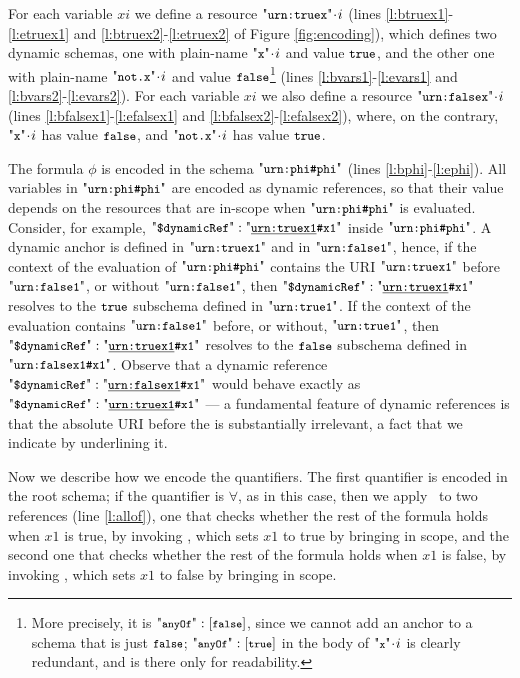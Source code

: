 For each variable $xi$ we define a resource $\qkw{urn:truex}\cat i$ (lines \ref{l:btruex1}-\ref{l:etruex1} 
and \ref{l:btruex2}-\ref{l:etruex2}  of Figure \ref{fig:encoding}), 
which defines two dynamic schemas,
one with plain-name $\qkw{x}\cat i$ and value $\mbox{\tt{\small true}}$, and the other one with plain-name $\qkw{not.x}\cat i$ and value 
$\mbox{\tt{\small false}}$\footnote{More precisely, it is $\qkw{\footnotesize anyOf}: [\akw{\footnotesize false}]$,
since we cannot add an anchor to a schema that is just $\mbox{\tt{\small \footnotesize false}}$; 
$\qkw{\footnotesize anyOf}: [\akw{\footnotesize true}]$ in the body of  $\qkw{\footnotesize x}\cat i$ is clearly redundant, and is there only for readability.}
(lines \ref{l:bvars1}-\ref{l:evars1}  and \ref{l:bvars2}-\ref{l:evars2}).
For each variable $xi$ we also define a resource $\qkw{urn:falsex}\cat i$ 
(lines \ref{l:bfalsex1}-\ref{l:efalsex1}  and \ref{l:bfalsex2}-\ref{l:efalsex2}),
where, on the contrary, $\qkw{x}\cat i$ has value $\mbox{\tt{\small false}}$, and $\qkw{not.x}\cat i$ has value $\mbox{\tt{\small true}}$.

The formula $\phi$ is encoded in the schema $\qkw{urn:phi\#phi}$  (lines \ref{l:bphi}-\ref{l:ephi}).
All variables in $\qkw{urn:phi\#phi}$ 
are encoded as dynamic references, so that their value depends on the resources that are in-scope when 
$\qkw{urn:phi\#phi}$ is evaluated.
Consider, for example, $\qddref: \qkw{\underline{urn:truex1}\#x1}$ inside $\qkw{urn:phi\#phi}$.
A dynamic anchor  is defined in %
 $\qkw{urn:truex1}$ and in $\qkw{urn:false1}$,
hence, if the context of the evaluation of $\qkw{urn:phi\#phi}$ contains the URI $\qkw{urn:truex1}$
before $\qkw{urn:false1}$, or without
$\qkw{urn:false1}$,
then $\qddref: \qkw{\underline{urn:truex1}\#x1}$ resolves to the $\mbox{\tt{\small true}}$ subschema defined in $\qkw{urn:true1}$. 
If the context of the evaluation contains $\qkw{urn:false1}$
before, or without, $\qkw{urn:true1}$, then $\qddref: \qkw{\underline{urn:truex1}\#x1}$ resolves to the $\mbox{\tt{\small false}}$ subschema
defined in $\qkw{urn:falsex1\#x1}$.
Observe that a dynamic reference $\qddref: \qkw{\underline{urn:falsex1}\#x1}$ would behave exactly as
$\qddref: \qkw{\underline{urn:truex1}\#x1}$ --- a fundamental feature of dynamic references is that the 
absolute URI before the \qkw{\#} is substantially irrelevant, a fact that we indicate by underlining it.

Now we describe how we encode the quantifiers.
The first quantifier is encoded in the root schema; if the quantifier is $\forall$, as in this case,
then we apply \qall\ to two references (line \ref{l:allof}),
one that checks whether the rest of the formula holds when $x1$ is true, by invoking ,
which sets $x1$ to true by bringing  in scope,
and the second one that checks whether the rest of the formula holds when $x1$ is false, by invoking ,
which sets $x1$ to false by bringing  in scope.

